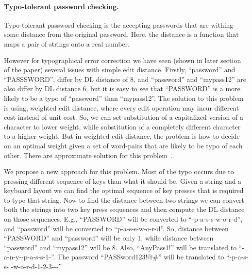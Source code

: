 \paragraph{Typo-tolerant password checking.}  
Typo tolerant password checking is the accepting passwords that are withing some
distance from the original password. Here, the distance is a function that maps
a pair of strings onto a real number.





  However for typographical error correction we
have seen (shown in later section of the paper) several issues with simple edit
distance. Firstly, ``password'' and ``PASSSWORD'', differ by DL distance of 8,
and ``password'' and ``mypass12'' are also differ by DL distance 6, but it is
easy to see that ``PASSWORD'' is a more likely to be a typo of ``password'' than
``mypass12''. The solution to this problem is using, weighted edit distance,
where every edit operation may incur different cost instead of unit cost. So, we
can set substitution of a capitalized version of a character to lower weight,
while substitution of a completely different character to a higher weight. But
in weighted edit distance, the problem is how to decide on an optimal weight
given a set of word-pairs that are likely to be typo of each other. There are
approximate solution for this problem~\cite{hauser2007unsupervised}.

We propose a new approach for this problem. Most of the typo occurs due to
pressing different sequence of keys than what it should be. Given a string and a
keyboard layout we can find the optimal sequence of key presses that is required
to type that string. Now to find the distance between two strings we can convert
both the strings into two key press sequences and then compute the DL distance
on those sequences. E.g., ``PASSWORD'' will be converted to
``\caps -p-a-s-s-w-o-r-d'', and ``password'' will be converted to
``p-a-s-s-w-o-r-d''. So, distance between ``PASSWORD'' and ``password'' will be
only 1, while distance between ``password'' and ``mypass12'' will be 8. Also,
``AnyPass1!'' will be translated to ``\shift -a-n-y-\shift -p-a-s-s-1-''.
The password ``PASSword123!@\#'' will be translated to ``\caps -p-a-s-s-\caps
-w-o-r-d-1-2-3---''

